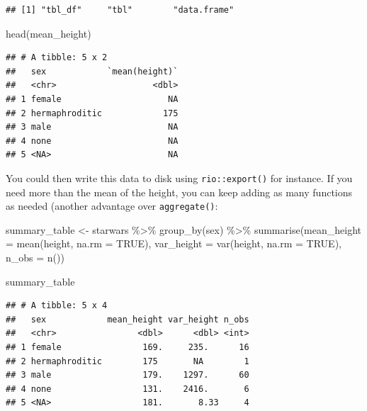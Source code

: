 \documentclass[
]{article}
\newenvironment{Shaded}{\begin{snugshade}}{\end{snugshade}}
\newcommand{\AttributeTok}[1]{\textcolor[rgb]{0.77,0.63,0.00}{#1}}
\newcommand{\ConstantTok}[1]{\textcolor[rgb]{0.00,0.00,0.00}{#1}}
\newcommand{\FunctionTok}[1]{\textcolor[rgb]{0.00,0.00,0.00}{#1}}
\newcommand{\NormalTok}[1]{#1}
\newcommand{\OtherTok}[1]{\textcolor[rgb]{0.56,0.35,0.01}{#1}}
\newcommand{\SpecialCharTok}[1]{\textcolor[rgb]{0.00,0.00,0.00}{#1}}
\begin{document}
\begin{verbatim}
## [1] "tbl_df"     "tbl"        "data.frame"
\end{verbatim}

\begin{Shaded}
\begin{Highlighting}[]
\FunctionTok{head}\NormalTok{(mean\_height)}
\end{Highlighting}
\end{Shaded}

\begin{verbatim}
## # A tibble: 5 x 2
##   sex            `mean(height)`
##   <chr>                   <dbl>
## 1 female                     NA
## 2 hermaphroditic            175
## 3 male                       NA
## 4 none                       NA
## 5 <NA>                       NA
\end{verbatim}

You could then write this data to disk using \texttt{rio::export()} for instance. If you need more than
the mean of the height, you can keep adding as many functions as needed (another advantage over
\texttt{aggregate()}:

\begin{Shaded}
\begin{Highlighting}[]
\NormalTok{summary\_table }\OtherTok{\textless{}{-}}\NormalTok{ starwars }\SpecialCharTok{\%\textgreater{}\%}
  \FunctionTok{group\_by}\NormalTok{(sex) }\SpecialCharTok{\%\textgreater{}\%}
  \FunctionTok{summarise}\NormalTok{(}\AttributeTok{mean\_height =} \FunctionTok{mean}\NormalTok{(height, }\AttributeTok{na.rm =} \ConstantTok{TRUE}\NormalTok{),}
            \AttributeTok{var\_height =} \FunctionTok{var}\NormalTok{(height, }\AttributeTok{na.rm =} \ConstantTok{TRUE}\NormalTok{),}
            \AttributeTok{n\_obs =} \FunctionTok{n}\NormalTok{())}

\NormalTok{summary\_table}
\end{Highlighting}
\end{Shaded}

\begin{verbatim}
## # A tibble: 5 x 4
##   sex            mean_height var_height n_obs
##   <chr>                <dbl>      <dbl> <int>
## 1 female                169.     235.      16
## 2 hermaphroditic        175       NA        1
## 3 male                  179.    1297.      60
## 4 none                  131.    2416.       6
## 5 <NA>                  181.       8.33     4
\end{verbatim}
\end{document}
